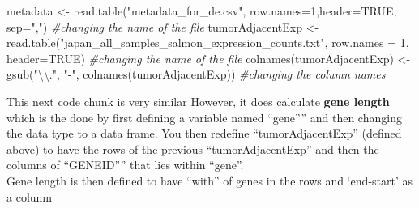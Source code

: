 \documentclass[
]{article}
\newenvironment{Shaded}{\begin{snugshade}}{\end{snugshade}}
\newcommand{\AttributeTok}[1]{\textcolor[rgb]{0.77,0.63,0.00}{#1}}
\newcommand{\CommentTok}[1]{\textcolor[rgb]{0.56,0.35,0.01}{\textit{#1}}}
\newcommand{\ConstantTok}[1]{\textcolor[rgb]{0.00,0.00,0.00}{#1}}
\newcommand{\DecValTok}[1]{\textcolor[rgb]{0.00,0.00,0.81}{#1}}
\newcommand{\FunctionTok}[1]{\textcolor[rgb]{0.00,0.00,0.00}{#1}}
\newcommand{\NormalTok}[1]{#1}
\newcommand{\OtherTok}[1]{\textcolor[rgb]{0.56,0.35,0.01}{#1}}
\newcommand{\SpecialCharTok}[1]{\textcolor[rgb]{0.00,0.00,0.00}{#1}}
\newcommand{\StringTok}[1]{\textcolor[rgb]{0.31,0.60,0.02}{#1}}
\begin{document}
\begin{Shaded}
\begin{Highlighting}[]
\NormalTok{metadata }\OtherTok{\textless{}{-}} \FunctionTok{read.table}\NormalTok{(}\StringTok{"metadata\_for\_de.csv"}\NormalTok{, }\AttributeTok{row.names=}\DecValTok{1}\NormalTok{,}\AttributeTok{header=}\ConstantTok{TRUE}\NormalTok{, }\AttributeTok{sep=}\StringTok{","}\NormalTok{) }\CommentTok{\#changing the name of the file}
\NormalTok{tumorAdjacentExp }\OtherTok{\textless{}{-}} \FunctionTok{read.table}\NormalTok{(}\StringTok{"japan\_all\_samples\_salmon\_expression\_counts.txt"}\NormalTok{, }\AttributeTok{row.names =} \DecValTok{1}\NormalTok{, }\AttributeTok{header=}\ConstantTok{TRUE}\NormalTok{) }\CommentTok{\#changing the name of the file }
\FunctionTok{colnames}\NormalTok{(tumorAdjacentExp) }\OtherTok{\textless{}{-}} \FunctionTok{gsub}\NormalTok{(}\StringTok{"}\SpecialCharTok{\textbackslash{}\textbackslash{}}\StringTok{."}\NormalTok{, }\StringTok{"{-}"}\NormalTok{, }\FunctionTok{colnames}\NormalTok{(tumorAdjacentExp)) }\CommentTok{\#changing the column names }
\end{Highlighting}
\end{Shaded}

This next code chunk is very similar However, it does calculate
\textbf{gene length} which is the done by first defining a variable
named ``gene'''' and then changing the data type to a data frame. You
then redefine ``tumorAdjacentExp'' (defined above) to have the rows of
the previous ``tumorAdjacentExp'' and then the columns of ``GENEID''''
that lies within ``gene''.\\
Gene length is then defined to have ``with'' of genes in the rows and
`end-start' as a column

\begin{Shaded}
\end{Shaded}
\end{document}

